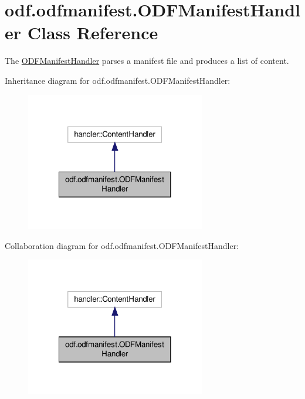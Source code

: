 \hypertarget{classodf_1_1odfmanifest_1_1ODFManifestHandler}{\section{odf.\+odfmanifest.\+O\+D\+F\+Manifest\+Handler Class Reference}
\label{classodf_1_1odfmanifest_1_1ODFManifestHandler}
}


The \hyperlink{classodf_1_1odfmanifest_1_1ODFManifestHandler}{O\+D\+F\+Manifest\+Handler} parses a manifest file and produces a list of content.  




Inheritance diagram for odf.\+odfmanifest.\+O\+D\+F\+Manifest\+Handler\+:
\nopagebreak
\begin{figure}[H]
\begin{center}
\leavevmode
\includegraphics[width=222pt]{classodf_1_1odfmanifest_1_1ODFManifestHandler__inherit__graph}
\end{center}
\end{figure}


Collaboration diagram for odf.\+odfmanifest.\+O\+D\+F\+Manifest\+Handler\+:
\nopagebreak
\begin{figure}[H]
\begin{center}
\leavevmode
\includegraphics[width=222pt]{classodf_1_1odfmanifest_1_1ODFManifestHandler__coll__graph}
\end{center}
\end{figure}
